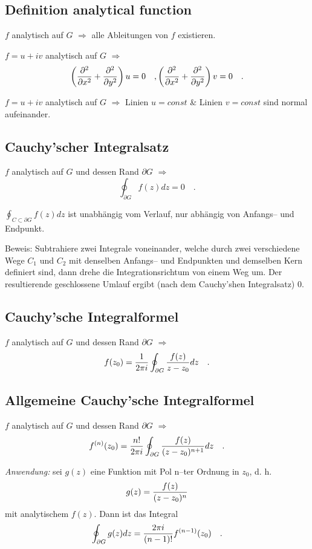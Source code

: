   \subsection{Definition analytical function}
 $f$ analytisch auf $G$ $\Longrightarrow$
 alle Ableitungen von $f$ existieren.


 $f=u+iv$ analytisch auf $G$ $\Longrightarrow$
 $$
 \left({\partial^2\over \partial x^2}
 + {\partial^2\over \partial y^2}\right)u=0\quad ,
 \left({\partial^2\over \partial x^2}
 + {\partial^2\over \partial y^2}\right)v=0\quad .
 $$


 $f=u+iv$ analytisch auf $G$ $\Longrightarrow$
 Linien $u=const$ \& Linien $v=const$ sind normal aufeinander.



 \subsection{Cauchy'scher Integralsatz}
 $f$ analytisch auf $G$ und dessen Rand $\partial G$
 $\Longrightarrow$
 $$\oint_{\partial G}f(z)dz=0\quad .$$


 $\oint_{C\subset \partial G}f(z)dz
$ ist unabh\"angig vom Verlauf,
 nur abh\"angig von Anfangs-- und Endpunkt.

 Beweis: Subtrahiere zwei Integrale voneinander, welche
 durch zwei verschiedene Wege $C_1$ und $C_2$ mit
 denselben Anfangs-- und Endpunkten und demselben Kern definiert sind,
 dann drehe die Integrationsrichtum von einem Weg um. Der resultierende
 geschlossene Umlauf ergibt (nach dem Cauchy'shen Integralsatz) 0.


 \subsection{Cauchy'sche Integralformel}
 $f$ analytisch auf $G$ und dessen Rand $\partial G$
 $\Longrightarrow$
 $$f(z_0)={1\over 2\pi i}\oint_{\partial G}{f(z)\over z-z_0}dz\quad
 .$$

 \subsection{Allgemeine Cauchy'sche Integralformel}
 $f$ analytisch auf $G$ und dessen Rand $\partial G$
 $\Longrightarrow$
 $$f^{(n)}(z_0)={n!\over 2\pi i}\oint_{\partial G}{f(z)\over
 (z-z_0)^{n+1}}dz\quad
 .$$

{\em Anwendung:} sei $g(z)$ eine Funktion mit Pol n--ter Ordnung in
 $z_0$, d. h.
 $$g(z)= {f(z)\over (z-z_0)^n}$$
 mit analytischem $f(z)$. Dann ist das Integral
 $$\oint_{\partial G}g(z)dz={2\pi i\over (n-1)!}f^{(n-1)}(z_0)\quad .$$



